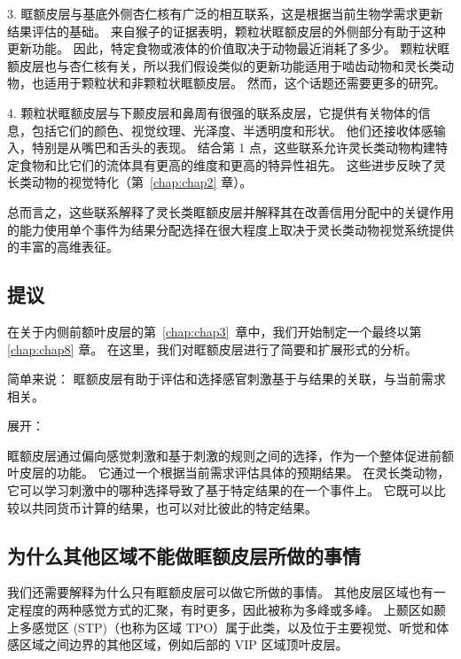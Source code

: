 3. 眶额皮层与基底外侧杏仁核有广泛的相互联系，这是根据当前生物学需求更新结果评估的基础。
来自猴子的证据表明，颗粒状眶额皮层的外侧部分有助于这种更新功能。
因此，特定食物或液体的价值取决于动物最近消耗了多少。
颗粒状眶额皮层也与杏仁核有关，所以我们假设类似的更新功能适用于啮齿动物和灵长类动物，也适用于颗粒状和非颗粒状眶额皮层。
然而，这个话题还需要更多的研究。\par


4. 颗粒状眶额皮层与下颞皮层和鼻周有很强的联系皮层，它提供有关物体的信息，包括它们的颜色、视觉纹理、光泽度、半透明度和形状。
他们还接收体感输入，特别是从嘴巴和舌头的表现。
结合第 1 点，这些联系允许灵长类动物构建特定食物和比它们的流体具有更高的维度和更高的特异性祖先。
这些进步反映了灵长类动物的视觉特化（第~\ref{chap:chap2} 章）。\par


总而言之，这些联系解释了灵长类眶额皮层并解释其在改善信用分配中的关键作用的能力使用单个事件为结果分配选择在很大程度上取决于灵长类动物视觉系统提供的丰富的高维表征。



\subsection{提议}

在关于内侧前额叶皮层的第~\ref{chap:chap3}~章中，我们开始制定一个最终以第 \ref{chap:chap8} 章。
在这里，我们对眶额皮层进行了简要和扩展形式的分析。\par


简单来说：
眶额皮层有助于评估和选择感官刺激基于与结果的关联，与当前需求相关。\par


展开：\par
眶额皮层通过偏向感觉刺激和基于刺激的规则之间的选择，作为一个整体促进前额叶皮层的功能。
它通过一个根据当前需求评估具体的预期结果。
在灵长类动物，它可以学习刺激中的哪种选择导致了基于特定结果的在一个事件上。
它既可以比较以共同货币计算的结果，也可以对比彼此的特定结果。\par



\subsection{为什么其他区域不能做眶额皮层所做的事情}

我们还需要解释为什么只有眶额皮层可以做它所做的事情。 
其他皮层区域也有一定程度的两种感觉方式的汇聚，有时更多，因此被称为多峰或多峰。
上颞区如颞上多感觉区 (STP)（也称为区域 TPO）属于此类\cite{seltzer1994parietal}，以及位于主要视觉、听觉和体感区域之间边界的其他区域，例如后部的 VIP 区域顶叶皮层\cite{schlack2005multisensory}。\par


